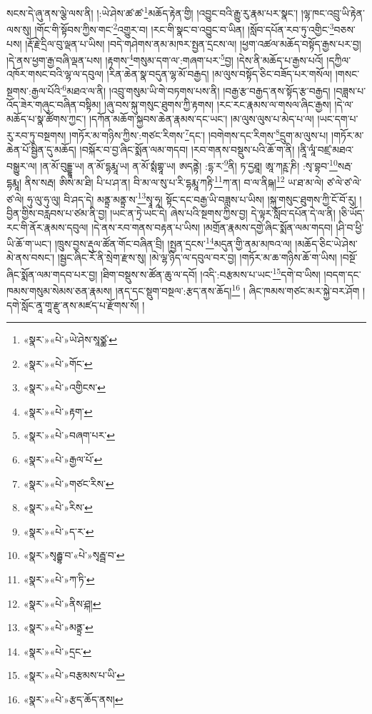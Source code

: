 སངས་དེ་ཞུ་ནས་ལྕེ་ལས་ནི། །:ཡེ་ཤེས་ཚ་ཚ་\footnote{«སྣར་»«པེ་»ཡེ་ཤེས་སཱཙྪ་}མཆོད་རྟེན་གྱི། །འབྱུང་བའི་རྒྱུ་རུ་རྣམ་པར་སྣང་། །ལྷ་ཁང་འབྲུ་ཡི་རྟེན་ལས་སུ། །གོང་གི་སྟོབས་ཀྱིས་གང་\footnote{«སྣར་»«པེ་»གོང་}འགྱུར་བ། །རང་གི་སྣང་བ་འབྱུང་བ་ཡིན། །སློབ་དཔོན་རབ་ཏུ་འགྱིང་\footnote{«སྣར་»«པེ་»འགྱིངས་}བཅས་པས། །རྡོ་རྗེ་དྲིལ་བུ་ལྡན་པ་ཡིས། །བདེ་གཤེགས་ནམ་མཁར་སྤྱན་དྲངས་ལ། །ཕྱག་འཚལ་མཆོད་བསྟོད་རྒྱས་པར་བྱ། །དེ་ནས་ཕྱག་རྒྱ་བཞི་ལྡན་པས། །རྟགས་\footnote{«སྣར་»«པེ་»རྟག་}གསུམ་དག་ལ་:གཞག་པར་\footnote{«སྣར་»«པེ་»བཞག་པར་}བྱ། །དེས་ནི་མཆོད་པ་རྒྱས་པའོ། །དཀྱིལ་འཁོར་གསང་བའི་ལྷ་ལ་དབུལ། །རིན་ཆེན་སྣ་བདུན་ལྷ་མོ་བརྒྱད། །མ་ལུས་བསྟོད་ཅིང་བཟོད་པར་གསོལ། །གསང་སྔགས་:རྒྱལ་པོའི་\footnote{«སྣར་»«པེ་»རྒྱལ་པོ་}མཐའ་ལ་ནི། །འབྲུ་གསུམ་ཡི་གེ་བཏགས་པས་ནི། །བརྒྱ་རྩ་བརྒྱད་ནས་སྟོད་རྩ་བརྒྱད། །བཟླས་པ་འོད་ཟེར་གཞུང་བཞིན་བསྟིམ། །ཞུ་བས་སྐུ་གསུང་ཐུགས་ཀྱི་རྟགས། །རང་རང་རྣམས་ལ་གསལ་ཞིང་རྒྱས། །དེ་ལ་མཆོད་པ་སྣ་ཚོགས་ཀྱང་། །དཀོན་མཆོག་སྐྱབས་ཆེན་རྣམས་དང་ཡང་། །མ་ལུས་ལུས་པ་མེད་པ་ལ། །ཡང་དག་པ་རུ་རབ་ཏུ་བསྔགས། །གཏོར་མ་གཉིས་ཀྱིས་:གཙང་རིགས་\footnote{«སྣར་»«པེ་»གཙང་རིས་}དང་། །བགེགས་དང་རིགས་\footnote{«སྣར་»«པེ་»རིས་}དྲུག་མ་ལུས་པ། །གཏོར་མ་ཆེན་པོ་སྦྱིན་དུ་མཆོད། །བསྐོར་བ་བྱ་ཞིང་སྨོན་ལམ་གདབ། །རབ་གནས་བསྡུས་པའི་ཆོ་ག་ནི། །ནཱི་ལཱཾ་བཛྲ་མཐའ་བསྒྱུར་ལ། །ན་མོ་བུདྡྷཱ་ཡ། ན་མོ་དྷརྨཱ་ཡ། ན་མོ་སྶཾགྷཱ་ཡ། ཨདནྟེ། :དྷ་ར་\footnote{«སྣར་»«པེ་»ད་ར་}ནི། ཏ་དྱཐཱ། ཨཱ་ཀཪྵ་ཎི། :སྭ་བྷབ་\footnote{«སྣར་»སྭརྦྷ་བ་«པེ་»སྭརྦྦ་བ་}སརྦ་དྷརྨཱ། ནིས་སརྦ། ཨིས་མ་ཐི། པི་པ་ཤ་ན། བི་མ་ལ་སུ་པ་རི་དྷརྨཱ་ཀརྟི་\footnote{«སྣར་»«པེ་»ཀ་ཏི་}ཀ་ན། བ་ལ་ནིཥྐ།\footnote{«སྣར་»«པེ་»ནིས་ཤྐ།} ཡ་ཐ་མ་ལེ། ཙ་ལེ་ཙ་ལེ་ཙ་ལེ། ཧུ་ལུ་ཧུ་ལུ། བི་ཤད་དེ། མནྟྲ་མནྟྲ་ས་\footnote{«སྣར་»«པེ་»མནྟྲ་}སྭཱ་ཧཱ། སྟོང་དང་བརྒྱ་ཡི་བཟླས་པ་ཡིས། །སྐུ་གསུང་ཐུགས་ཀྱི་ངོ་བོ་རུ། །བྱིན་གྱིས་བརླབས་པ་ཙམ་ནི་བྱ། །ཡང་ན་ཏྲེ་ཡང་དེ། ཞེས་པའི་སྔགས་ཀྱིས་བྱ། དེ་ལྟར་སློབ་དཔོན་དེ་ལ་ནི། །ཅི་ཡོད་རང་གི་ནོར་རྣམས་དབུལ། །དེ་ནས་རབ་གནས་བརྟན་པ་ཡིས། །མགྲོན་རྣམས་དགྱེ་ཞིང་སྨོན་ལམ་གདབ། །ཤི་བ་ཕྱི་ཡི་ཆོ་ག་ཡང་། །ཁྲུས་བྱས་རྡུལ་ཚོན་གོང་བཞིན་བྲི། །སྤྱན་དྲངས་\footnote{«སྣར་»«པེ་»དྲང་}མདུན་གྱི་ནམ་མཁའ་ལ། །མཆོད་ཅིང་ཡེ་ཤེས་མེ་ནས་བསང་། །སྦྱང་ཞིང་རོ་ནི་སྲེག་རྫས་སུ། །མེ་ལྷ་ཉིད་ལ་དབུལ་བར་བྱ། །གཏོར་མ་ཆ་གཉིས་ཆོ་ག་ཡིས། །བསྔོ་ཞིང་སྨོན་ལམ་གདབ་པར་བྱ། །ཐིག་བསྡུས་ས་ཚོན་ཆུ་ལ་དབོ། །འདི་:བརྩམས་པ་ཡང་\footnote{«སྣར་»«པེ་»བརྩམས་པ་ཡི་}དགེ་བ་ཡིས། །བདག་དང་ཁམས་གསུམ་སེམས་ཅན་རྣམས། །ནད་དང་སྡུག་བསྔལ་:རྩད་ནས་ཆོད།\footnote{«སྣར་»«པེ་»རྩད་ཆོད་ནས།} །
ཞིང་ཁམས་གཙང་མར་སྐྱེ་བར་ཤོག །དགེ་སློང་ནཱ་གཱ་རྫུ་ནས་མཛད་པ་རྫོགས་སོ། ། 